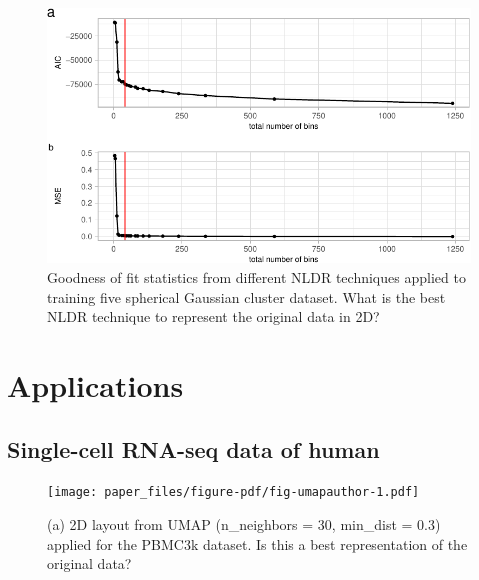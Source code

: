 \documentclass[
  12pt]{article}
\begin{document}
\begin{figure}

{\centering \includegraphics[width=1\textwidth,height=\textheight]{paper_files/figure-pdf/fig-diagnosticpltGau-1.pdf}

}

\caption{\label{fig-diagnosticpltGau}Goodness of fit statistics from
different NLDR techniques applied to training five spherical Gaussian
cluster dataset. What is the best NLDR technique to represent the
original data in 2D?}

\end{figure}

\hypertarget{sec-applications}{%
\section{Applications}\label{sec-applications}}

\hypertarget{single-cell-rna-seq-data-of-human}{%
\subsection{Single-cell RNA-seq data of
human}\label{single-cell-rna-seq-data-of-human}}

\begin{figure}[H]

{\centering \texttt{[image: paper\_files/figure-pdf/fig-umapauthor-1.pdf]}

}

\caption{\label{fig-umapauthor}(a) 2D layout from UMAP (n\_neighbors =
30, min\_dist = 0.3) applied for the PBMC3k dataset. Is this a best
representation of the original data?}

\end{figure}
\end{document}

